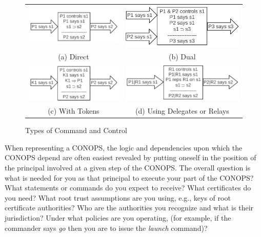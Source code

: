 \begin{figure}[t]
  \centering
  \begin{tabular}{cc}
  \includegraphics[width=0.4\linewidth]{Figures/c2conops/direct} 
  &
  \includegraphics[width=0.4 \linewidth]{Figures/c2conops/dual}\\
  (a) Direct & (b) Dual\\
  \includegraphics[width=0.4\linewidth]{Figures/c2conops/token} 
  &
  \includegraphics[width=0.4 \linewidth]{Figures/c2conops/roles}\\
  (c) With Tokens & (d) Using Delegates or Relays \\
\end{tabular}
  \caption{Types of Command and Control}
  \label{fig:C2-types}
\end{figure}

When representing a CONOPS, the logic and dependencies upon which the
CONOPS depend are often easiest revealed by putting oneself in the
position of the principal involved at a given step of the CONOPS. The
overall question is what is needed for you as that principal to
execute your part of the CONOPS?  What statements or commands do you
expect to receive? What certificates do you need? What root trust
assumptions are you using, e.g., keys of root certificate authorities?
Who are the authorities you recognize and what is their jurisdiction?
Under what policies are you operating, (for example, if the commander
says \emph{go} then you are to issue the \emph{launch} command)?

